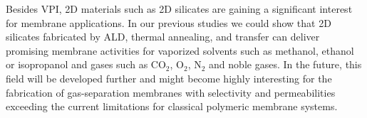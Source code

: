\documentclass[AMA,STIX2COL]{WileyNJD-v2} %
\begin{document}
Besides VPI, 2D materials such as 2D silicates are gaining a significant interest for membrane applications. In our previous studies we could show that 2D silicates fabricated by ALD, thermal annealing, and transfer can deliver promising membrane activities for vaporized solvents such as methanol, ethanol or isopropanol and gases such as CO$_2$, O$_2$, N$_2$ and noble gases. \cite{naberezhnyi2022, dementyev2022} In the future, this field will be developed further and might become highly interesting for the fabrication of gas-separation membranes with selectivity and permeabilities exceeding the current limitations for classical polymeric membrane systems.


\end{document}
